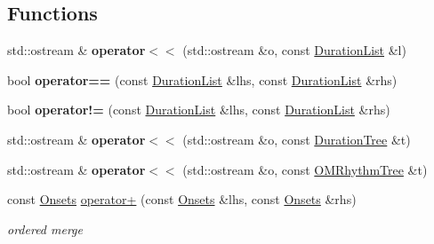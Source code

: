 \subsection*{Functions}
\begin{DoxyCompactItemize}
\item 
\mbox{\label{group__output_gaca893b02b4d6e0b4a33e08e8fedd3e00}} 
std\+::ostream \& {\bfseries operator$<$$<$} (std\+::ostream \&o, const \mbox{\hyperlink{classDurationList}{Duration\+List}} \&l)
\item 
\mbox{\label{group__output_gaa14d56806f18314e1c59a090964bc687}} 
bool {\bfseries operator==} (const \mbox{\hyperlink{classDurationList}{Duration\+List}} \&lhs, const \mbox{\hyperlink{classDurationList}{Duration\+List}} \&rhs)
\item 
\mbox{\label{group__output_ga6a883cabc768b899c9a5edcd3c3d5dd2}} 
bool {\bfseries operator!=} (const \mbox{\hyperlink{classDurationList}{Duration\+List}} \&lhs, const \mbox{\hyperlink{classDurationList}{Duration\+List}} \&rhs)
\item 
\mbox{\label{group__output_ga580b3f6969d32fc7ad84b7d6fec0ecbe}} 
std\+::ostream \& {\bfseries operator$<$$<$} (std\+::ostream \&o, const \mbox{\hyperlink{classDurationTree}{Duration\+Tree}} \&t)
\item 
\mbox{\label{group__output_gad0161a497bb5a9861366ec032cd79392}} 
std\+::ostream \& {\bfseries operator$<$$<$} (std\+::ostream \&o, const \mbox{\hyperlink{classOMRhythmTree}{O\+M\+Rhythm\+Tree}} \&t)
\item 
\mbox{\label{group__output_ga42a2ffdfe358dcac1df9704c4179dfeb}} 
const \mbox{\hyperlink{classOnsets}{Onsets}} \mbox{\hyperlink{group__output_ga42a2ffdfe358dcac1df9704c4179dfeb}{operator+}} (const \mbox{\hyperlink{classOnsets}{Onsets}} \&lhs, const \mbox{\hyperlink{classOnsets}{Onsets}} \&rhs)
\begin{DoxyCompactList}\small\item\em ordered merge \end{DoxyCompactList}\item 
\mbox{\label{group__output_ga633737bbc1050067a6ae18fac4de863f}} 

\end{DoxyCompactItemize}
